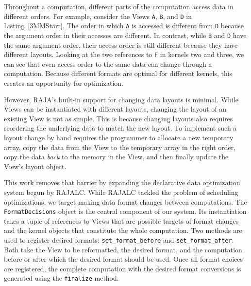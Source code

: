 \documentclass[sigconf,review=true]{acmart}
\begin{document}
Throughout a computation, different parts of the computation access data in different orders.
For example, consider the Views \verb.A., \verb.B., and \verb.D. in Listing~\ref{3MMStart}. 
The order in which \verb.A. is accessed is different from \verb.D. because the argument order in their accesses are different.
In contrast, while \verb.B. and \verb.D. have the same argument order, their access order is still different because they have different layouts.
Looking at the two references to \verb.F. in kernels two and three, we can see that even access order to the same data can change through a computation.
Because different formats are optimal for different kernels, this creates an opportunity for optimization. 

However, RAJA's built-in support for changing data layouts is minimal. 
While Views can be instantiated with different layouts, changing the layout of an existing View is not as simple.
This is because changing layouts also requires reordering the underlying data to match the new layout. 
To implement such a layout change by hand requires the programmer to allocate a new temporary array, 
copy the data from the View to the temporary array in the right order, 
copy the data \textit{back} to the memory in the View, 
and then finally update the View's layout object.

This work removes that barrier by expanding the declarative data optimization system begun by RAJALC.
While RAJALC tackled the problem of scheduling optimizations, we target making data format changes between computations. 
The \verb.FormatDecisions. object is the central component of our system. 
Its instantiation takes a tuple of references to Views that are possible targets of format changes and the kernel objects that constitute the whole computation.
Two methods are used to register desired formats: \verb.set_format_before. and \verb.set_format_after..
Both take the View to be reformatted, the desired format, and the computation before or after which the desired format should be used.
Once all format choices are registered, the complete computation with the desired format conversions is generated using the \verb.finalize. method.
\end{document}

